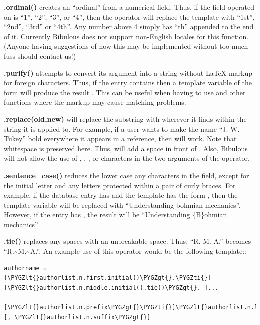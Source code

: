 \documentclass[letterpaper,10pt,english]{sphinxmanual}
\def\PYGZlt{\char`\<}
\def\PYGZgt{\char`\>}
\def\PYGZti{\char`\~}
\begin{document}
\textbf{.ordinal()} creates an ``ordinal'' from a numerical field. Thus, if the field operated on is ``1'', ``2'', ``3'', or ``4'', then the operator will replace the template with ``1st'', ``2nd'', ``3rd'' or ``4th''. Any number above 4 simply has ``th'' appended to the end of it. Currently Bibulous does not support non-English locales for this function. (Anyone having suggestions of how this may be implemented without too much fuss should contact us!)

\textbf{.purify()} attempts to convert its argument into a string without LaTeX-markup for foreign characters. Thus, if the entry contains  then a template variable of the form  will produce the result . This can be useful when having to use  and other functions where the markup may cause matching problems.

\textbf{.replace(old,new)} will replace the substring  with  wherever it finds  within the string it is applied to. For example, if a user wants to make the name ``J. W. Tukey'' bold everywhere it appears in a reference, then  will work. Note that whitespace is preserved here. Thus,  will add a space in front of . Also, Bibulous will not allow the use of \code{\textless{}}, \code{\textgreater{}}, \code{\textbar{}}, or \code{)} characters in the two arguments of the operator.

\textbf{.sentence\_case()} reduces the lower case any characters in the field, except for the initial letter and any letters protected within a pair of curly braces. For example, if the database entry has  and the template has the form , then the template variable will be replaced with ``Understanding bohmian mechanics''. However, if the entry has , the result will be ``Understanding \{B\}ohmian mechanics''.

\textbf{.tie()} replaces any spaces with an unbreakable space. Thus, ``R. M. A.'' becomes ``R.\textasciitilde{}M.\textasciitilde{}A.''. An example use of this operator would be the following template::

\begin{Verbatim}[commandchars=\\\{\}]
authorname = [\PYGZlt{}authorlist.n.first.initial()\PYGZgt{}.\PYGZti{}][\PYGZlt{}authorlist.n.middle.initial().tie()\PYGZgt{}. ]...
             [\PYGZlt{}authorlist.n.prefix\PYGZgt{}\PYGZti{}]\PYGZlt{}authorlist.n.last\PYGZgt{}[, \PYGZlt{}authorlist.n.suffix\PYGZgt{}]
\end{Verbatim}
\end{document}
